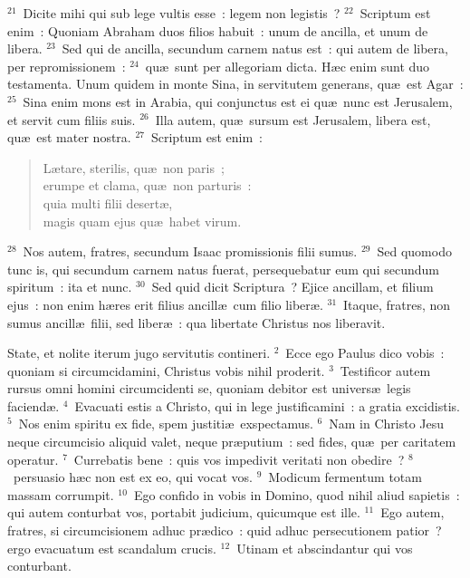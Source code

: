 ${}^{21}$~Dicite mihi qui sub lege vultis esse~: legem non legistis~?
${}^{22}$~Scriptum est enim~: Quoniam Abraham duos filios habuit~: unum de ancilla, et unum de libera.
${}^{23}$~Sed qui de ancilla, secundum carnem natus est~: qui autem de libera, per repromissionem~:
${}^{24}$~qu\ae\ sunt per allegoriam dicta. H\ae c enim sunt duo testamenta. Unum quidem in monte Sina, in servitutem generans, qu\ae\ est Agar~:
${}^{25}$~Sina enim mons est in Arabia, qui conjunctus est ei qu\ae\ nunc est Jerusalem, et servit cum filiis suis.
${}^{26}$~Illa autem, qu\ae\ sursum est Jerusalem, libera est, qu\ae\ est mater nostra.
${}^{27}$~Scriptum est enim~: \begin{flushleft}\begin{verse}L\ae tare, sterilis, qu\ae\ non paris~;\\ erumpe et clama, qu\ae\ non parturis~:\\ quia multi filii desert\ae ,\\ magis quam ejus qu\ae\ habet virum.\end{verse}\end{flushleft}


${}^{28}$~Nos autem, fratres, secundum Isaac promissionis filii sumus.
${}^{29}$~Sed quomodo tunc is, qui secundum carnem natus fuerat, persequebatur eum qui secundum spiritum~: ita et nunc.
${}^{30}$~Sed quid dicit Scriptura~? Ejice ancillam, et filium ejus~: non enim h\ae res erit filius ancill\ae\ cum filio liber\ae .
${}^{31}$~Itaque, fratres, non sumus ancill\ae\ filii, sed liber\ae~: qua libertate Christus nos liberavit.

\bchapter
\lettrine[lines=3,image=true,loversize=0.05,lraise=-0.03]{S}{}tate, et nolite iterum jugo servitutis contineri.
${}^{2}$~Ecce ego Paulus dico vobis~: quoniam si circumcidamini, Christus vobis nihil proderit.
${}^{3}$~Testificor autem rursus omni homini circumcidenti se, quoniam debitor est univers\ae\ legis faciend\ae .
${}^{4}$~Evacuati estis a Christo, qui in lege justificamini~: a gratia excidistis.
${}^{5}$~Nos enim spiritu ex fide, spem justiti\ae\ exspectamus.
${}^{6}$~Nam in Christo Jesu neque circumcisio aliquid valet, neque pr\ae putium~: sed fides, qu\ae\ per caritatem operatur.
${}^{7}$~Currebatis bene~: quis vos impedivit veritati non obedire~?
${}^{8}$~persuasio h\ae c non est ex eo, qui vocat vos.
${}^{9}$~Modicum fermentum totam massam corrumpit.
${}^{10}$~Ego confido in vobis in Domino, quod nihil aliud sapietis~: qui autem conturbat vos, portabit judicium, quicumque est ille.
${}^{11}$~Ego autem, fratres, si circumcisionem adhuc pr\ae dico~: quid adhuc persecutionem patior~? ergo evacuatum est scandalum crucis.
${}^{12}$~Utinam et abscindantur qui vos conturbant.


